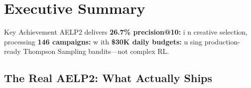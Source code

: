 \documentclass[11pt,a4paper]{report}
\newcommand{\metric}[2]{%
    \colorbox{aelpgreen!20}{\textbf{#1:} #2}%
}
\begin{document}
\chapter*{Executive Summary}

\begin{insightbox}{Key Achievement}
AELP2 delivers \metric{26.7\% precision@10} in creative selection, processing \metric{146 campaigns} with \metric{\$30K daily budgets} using production-ready Thompson Sampling bandits—not complex RL.
\end{insightbox}

\section*{The Real AELP2: What Actually Ships}
\end{document}
